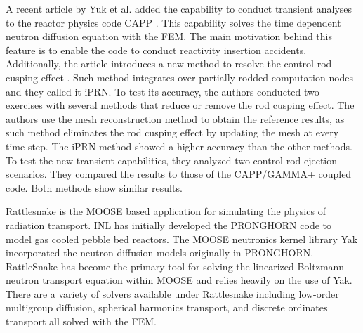 \documentclass[11pt,letterpaper]{article}
\begin{document}
A recent article by Yuk et al. \cite{yuk_time-dependent_2020} added the capability to conduct transient analyses to the reactor physics code CAPP \cite{lee_development_2011}.
This capability solves the time dependent neutron diffusion equation with the \gls{FEM}.
The main motivation behind this feature is to enable the code to conduct reactivity insertion accidents.
Additionally, the article introduces a new method to resolve the control rod cusping effect \cite{joo_resolution_1984}.
Such method integrates over partially rodded computation nodes and they called it iPRN.
To test its accuracy, the authors conducted two exercises with several methods that reduce or remove the rod cusping effect.
The authors use the mesh reconstruction method to obtain the reference results, as such method eliminates the rod cusping effect by updating the mesh at every time step.
The iPRN method showed a higher accuracy than the other methods.
To test the new transient capabilities, they analyzed two control rod ejection scenarios.
They compared the results to those of the CAPP/GAMMA+ coupled code.
Both methods show similar results.




Rattlesnake \cite{wang_rattlesnake_2019} is the MOOSE \cite{gaston_moose_2009} based application for simulating the physics of radiation transport.
\gls{INL} has initially developed the PRONGHORN code to model gas cooled pebble bed reactors.
The MOOSE neutronics kernel library Yak incorporated the neutron diffusion models originally in PRONGHORN.
RattleSnake has become the primary tool for solving the linearized Boltzmann neutron transport equation within MOOSE and relies heavily on the use of Yak.
There are a variety of solvers available under Rattlesnake including low-order multigroup diffusion, spherical harmonics transport, and discrete ordinates transport all solved with the \gls{FEM}.
\end{document}
